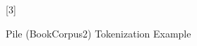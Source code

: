 \documentclass[11pt]{article}
\begin{document}
\begin{figure}[p]
\begin{minipage}{\textwidth}
\begin{tokenized}
{[3]\linebreak[3]\linebreak[3]\linebreak[3]\linebreak[3]\linebreak[3]\tokenbox{,}\linebreak[3]\linebreak[3]\linebreak[3]\linebreak[3]\linebreak[3]\linebreak[3]\linebreak[3]\linebreak[3]\linebreak[3]\linebreak[3]\linebreak[3]\tokenbox{~}\linebreak[3]
}
\end{tokenized}
\end{minipage}
    \caption{Pile (BookCorpus2) Tokenization Example}
    \label{fig:tok_example_1}
\end{figure}
\end{document}
